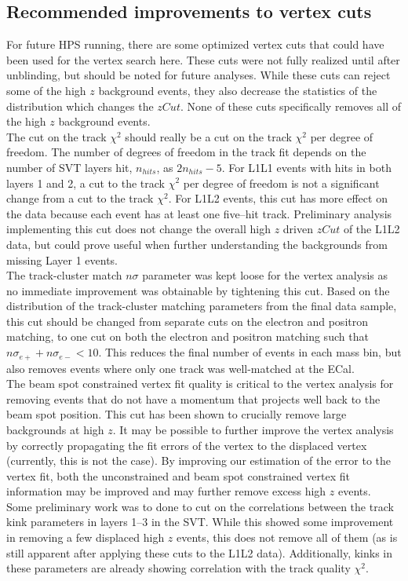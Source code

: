 \subsection{Recommended improvements to vertex cuts}
For future HPS running, there are some optimized vertex cuts that could have been used for the vertex search here. These cuts were not fully realized until after unblinding, but should be noted for future analyses. While these cuts can reject some of the high $z$ background events, they also decrease the statistics of the distribution which changes the $zCut$. None of these cuts specifically removes all of the high $z$ background events. \\
\indent The cut on the track $\chi^2$ should really be a cut on the track $\chi^2$ per degree of freedom. The number of degrees of freedom in the track fit depends on the number of SVT layers hit, $n_{hits}$, as $2n_{hits}-5$. For L1L1 events with hits in both layers 1 and 2, a cut to the track $\chi^2$ per degree of freedom is not a significant change from a cut to the track $\chi^2$. For L1L2 events, this cut has more effect on the data because each event has at least one five--hit track. Preliminary analysis implementing this cut does not change the overall high $z$ driven $zCut$ of the L1L2 data, but could prove useful when further understanding the backgrounds from missing Layer 1 events. \\
\indent The track-cluster match $n\sigma$ parameter was kept loose for the vertex analysis as no immediate improvement was obtainable by tightening this cut. Based on the distribution of the track-cluster matching parameters from the final data sample, this cut should be changed from separate cuts on the electron and positron matching, to one cut on both the electron and positron matching such that $n\sigma_{e+}+n\sigma_{e-}<10$. This reduces the final number of events in each mass bin, but also removes events where only one track was well-matched at the ECal.\\
\indent  The beam spot constrained vertex fit quality is critical to the vertex analysis for removing events that do not have a momentum that projects well back to the beam spot position. This cut has been shown to crucially remove large backgrounds at high $z$. It may be possible to further improve the vertex analysis by correctly propagating the fit errors of the vertex to the displaced vertex (currently, this is not the case). By improving our estimation of the error to the vertex fit, both the unconstrained and beam spot constrained vertex fit information may be improved and may further remove excess high $z$ events. \\
\indent Some preliminary work was to done to cut on the correlations between the track kink parameters in layers 1--3 in the SVT. While this showed some improvement in removing a few displaced high $z$ events, this does not remove all of them (as is still apparent after applying these cuts to the L1L2 data). Additionally, kinks in these parameters are already showing correlation with the track quality $\chi^2$.